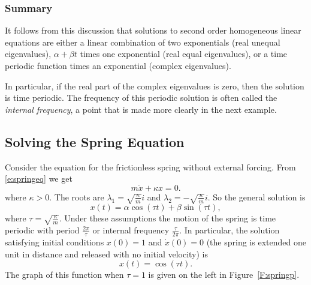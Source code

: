 \documentclass{ximera}
\begin{document}
\subsubsection*{Summary}

It follows from this discussion that solutions to second order
homogeneous linear equations are either a linear combination of two
exponentials (real unequal eigenvalues), $\alpha+\beta t$ times one
exponential (real equal eigenvalues), or a time periodic function times
an exponential (complex eigenvalues).

In particular, if the real part
of the complex eigenvalues is zero, then the solution is time periodic.
The frequency of this periodic solution is often called the {\em internal
frequency}, a point
that is made more clearly in the next example.


\subsection*{Solving the Spring Equation}

Consider the equation for the frictionless spring without
external forcing.  From \eqref{e:springeq} we get  
\begin{equation} \label{ex:uspring}
m\ddot{x} + \kappa x = 0.
\end{equation}
where $\kappa>0$.  The roots are $\lambda_1=\sqrt{\frac{\kappa}{m}}i$
and $\lambda_2=-\sqrt{\frac{\kappa}{m}}i$.  So the general solution is
\[
x(t) = \alpha\cos(\tau t) + \beta\sin(\tau t),
\]
where $\tau=\sqrt{\frac{\kappa}{m}}$.  Under these assumptions the
motion of the spring is time periodic with period $\frac{2\pi}{\tau}$
or internal frequency $\frac{\tau}{2\pi}$.  In particular, the solution
satisfying initial conditions $x(0)=1$ and $\dot{x}(0)=0$ (the spring is
extended one unit in distance and released with no initial velocity) is
\[
x(t) = \cos(\tau t).
\]
The graph of this function when $\tau=1$ is given on the
left in Figure~\ref{F:springp}.
\begin{figure*}[htb]
           \centerline{%
           }
           \caption{(Left) Graph of solution to undamped spring
	equation with initial conditions $x(0)=1$ and $\dot{x}(0)=0$.
	(Right) Graph of solution to damped spring equation with the
	same initial conditions.}
           \label{F:springp}
\end{figure*}
\end{document}
